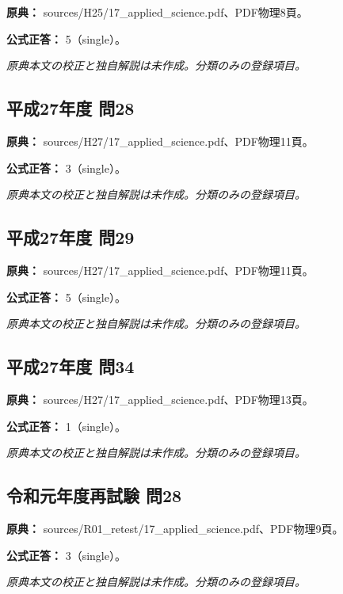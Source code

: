 \noindent\textbf{原典：} sources/H25/17\_applied\_science.pdf、PDF物理8頁。

\textbf{公式正答：} 5（single）。

\par\textit{原典本文の校正と独自解説は未作成。分類のみの登録項目。}

\subsection{平成27年度 問28}
\label{q:h27-reg-applied-28}

\noindent\textbf{原典：} sources/H27/17\_applied\_science.pdf、PDF物理11頁。

\textbf{公式正答：} 3（single）。

\par\textit{原典本文の校正と独自解説は未作成。分類のみの登録項目。}

\subsection{平成27年度 問29}
\label{q:h27-reg-applied-29}

\noindent\textbf{原典：} sources/H27/17\_applied\_science.pdf、PDF物理11頁。

\textbf{公式正答：} 5（single）。

\par\textit{原典本文の校正と独自解説は未作成。分類のみの登録項目。}

\subsection{平成27年度 問34}
\label{q:h27-reg-applied-34}

\noindent\textbf{原典：} sources/H27/17\_applied\_science.pdf、PDF物理13頁。

\textbf{公式正答：} 1（single）。

\par\textit{原典本文の校正と独自解説は未作成。分類のみの登録項目。}

\subsection{令和元年度再試験 問28}
\label{q:r01-ret-applied-28}

\noindent\textbf{原典：} sources/R01\_retest/17\_applied\_science.pdf、PDF物理9頁。

\textbf{公式正答：} 3（single）。

\par\textit{原典本文の校正と独自解説は未作成。分類のみの登録項目。}
